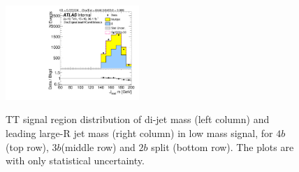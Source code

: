 \begin{figure}[htbp!]
\begin{center}
\includegraphics[width=0.45\textwidth,angle=-90]{figures/boosted/TT/Moriond_TT_TwoTag_split_Signal_leadHCand_Mass_s.pdf}\\
\end{center}
\caption{TT signal region distribution of di-jet mass (left column) and leading large-R jet mass (right column) in low mass signal, for $4b$ (top row), $3b$(middle row) and $2b$ split (bottom row). The plots are with only statistical uncertainty.}
\label{CRSB:TTSR_Distribution}
\end{figure}
